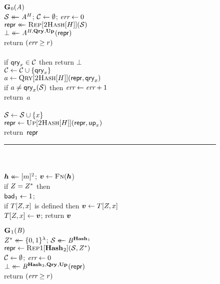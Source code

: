 \begin{figure}
  {
    \underline{$\G_0(\advA)$}\\[2pt]
      $\col \getsr \advA^H$; $\setC \gets \emptyset$; $\err \gets 0$\\
      $\pub \getsr \Rep[\hashbf[H]](\col)$\\
      $\bot \getsr \advA^{H,\QRYO,\UPO}(\pub)$\\
      return $(\err \geq r)$
    \\[6pt]
    \\[2pt]
      if $\qry_x \in \mathcal{C}$ then return $\bot$\\
      $\setC \gets \setC \union \{\qry_x\}$\\
      $a \gets \Qry[\hashbf[H]](\pub, \qry_x)$\\
      if $a \neq \qry_x(\col)$ then $\err \gets \err + 1$\\
      return~$a$
    \\[6pt]
    \\[2pt]
      $\col \gets \col \union \{x\}$\\
      $\pub \gets \Up[\hashbf[H]](\pub,\up_x)$\\
      return~$\pub$
    \\[4pt]
    \hspace*{-4pt}\rule{1.043\textwidth}{.4pt}
    \\[5pt]
     \hfill{}\hspace*{3pt}\\
      $\hh \getsr [m]^2$; $\vv \gets \fff(\hh$)\\
      if $\salt = \salt^*$ then\\
      \tab $\bad_1 \gets 1$; \\
      if $T[\salt,x]$ is defined then $\vv \gets T[\salt,x]$\\
      $T[\salt,x] \gets \vv$;
      return $\vv$
  }
  {
    \underline{$\G_1(\advB)$}\\[2pt]
      $\salt^* \getsr \bits^\lambda$;
      $\col \getsr \advB^{\HASHO_1}$\\
      $\pub \gets \Repx[\HASHO_2](\col, \salt^*)$\\
      $\setC \gets \emptyset$;
      $\err \gets 0$\\
      $\bot \getsr \advB^{\HASHO_3,\QRYO,\UPO}(\pub)$\\
      return $(\err \geq r)$
    \\[6pt]
}
\end{figure}

